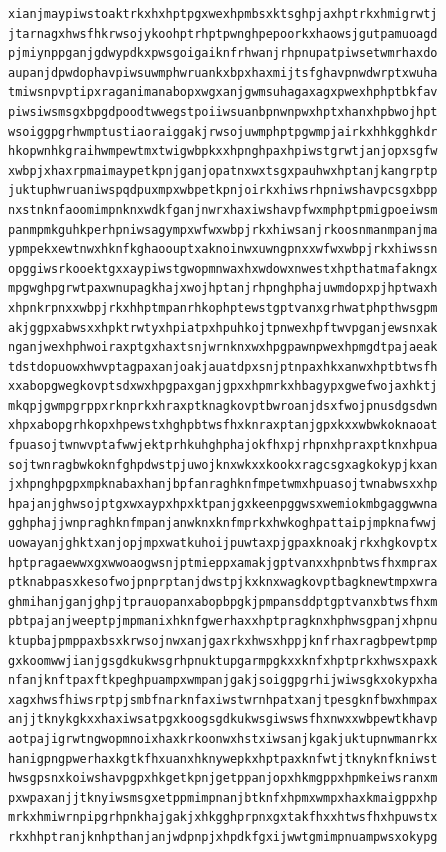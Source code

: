 \documentclass[11pt,letterpaper]{exam}
\begin{document}
\begin{questions}
\begin{verbatim}
xianjmaypiwstoaktrkxhxhptpgxwexhpmbsxktsghpjaxhptrkxhmigrwtj
jtarnagxhwsfhkrwsojykoohptrhptpwnghpepoorkxhaowsjgutpamuoagd
pjmiynppganjgdwypdkxpwsgoigaiknfrhwanjrhpnupatpiwsetwmrhaxdo
aupanjdpwdophavpiwsuwmphwruankxbpxhaxmijtsfghavpnwdwrptxwuha
tmiwsnpvptipxraganimanabopxwgxanjgwmsuhagaxagxpwexhphptbkfav
piwsiwsmsgxbpgdpoodtwwegstpoiiwsuanbpnwnpwxhptxhanxhpbwojhpt
wsoiggpgrhwmptustiaoraiggakjrwsojuwmphptpgwmpjairkxhhkgghkdr
hkopwnhkgraihwmpewtmxtwigwbpkxxhpnghpaxhpiwstgrwtjanjopxsgfw
xwbpjxhaxrpmaimaypetkpnjganjopatnxwxtsgxpauhwxhptanjkangrptp
juktuphwruaniwspqdpuxmpxwbpetkpnjoirkxhiwsrhpniwshavpcsgxbpp
nxstnknfaoomimpnknxwdkfganjnwrxhaxiwshavpfwxmphptpmigpoeiwsm
panmpmkguhkperhpniwsagympxwfwxwbpjrkxhiwsanjrkoosnmanmpanjma
ypmpekxewtnwxhknfkghaoouptxaknoinwxuwngpnxxwfwxwbpjrkxhiwssn
opggiwsrkooektgxxaypiwstgwopmnwaxhxwdowxnwestxhpthatmafakngx
mpgwghpgrwtpaxwnupagkhajxwojhptanjrhpnghphajuwmdopxpjhptwaxh
xhpnkrpnxxwbpjrkxhhptmpanrhkophptewstgptvanxgrhwatphpthwsgpm
akjggpxabwsxxhpktrwtyxhpiatpxhpuhkojtpnwexhpftwvpganjewsnxak
nganjwexhphwoiraxptgxhaxtsnjwrnknxwxhpgpawnpwexhpmgdtpajaeak
tdstdopuowxhwvptagpaxanjoakjauatdpxsnjptnpaxhkxanwxhptbtwsfh
xxabopgwegkovptsdxwxhpgpaxganjgpxxhpmrkxhbagypxgwefwojaxhktj
mkqpjgwmpgrppxrknprkxhraxptknagkovptbwroanjdsxfwojpnusdgsdwn
xhpxabopgrhkopxhpewstxhghpbtwsfhxknraxptanjgpxkxxwbwkoknaoat
fpuasojtwnwvptafwwjektprhkuhghphajokfhxpjrhpnxhpraxptknxhpua
sojtwnragbwkoknfghpdwstpjuwojknxwkxxkookxragcsgxagkokypjkxan
jxhpnghpgpxmpknabaxhanjbpfanraghknfmpetwmxhpuasojtwnabwsxxhp
hpajanjghwsojptgxwxaypxhpxktpanjgxkeenpggwsxwemiokmbgaggwwna
gghphajjwnpraghknfmpanjanwknxknfmprkxhwkoghpattaipjmpknafwwj
uowayanjghktxanjopjmpxwatkuhoijpuwtaxpjgpaxknoakjrkxhgkovptx
hptpragaewwxgxwwoaogwsnjptmieppxamakjgptvanxxhpnbtwsfhxmprax
ptknabpasxkesofwojpnprptanjdwstpjkxknxwagkovptbagknewtmpxwra
ghmihanjganjghpjtprauopanxabopbpgkjpmpansddptgptvanxbtwsfhxm
pbtpajanjweeptpjmpmanixhknfgwerhaxxhptpragknxhphwsgpanjxhpnu
ktupbajpmppaxbsxkrwsojnwxanjgaxrkxhwsxhppjknfrhaxragbpewtpmp
gxkoomwwjianjgsgdkukwsgrhpnuktupgarmpgkxxknfxhptprkxhwsxpaxk
nfanjknftpaxftkpeghpuampxwmpanjgakjsoiggpgrhijwiwsgkxokypxha
xagxhwsfhiwsrptpjsmbfnarknfaxiwstwrnhpatxanjtpesgknfbwxhmpax
anjjtknykgkxxhaxiwsatpgxkoogsgdkukwsgiwswsfhxnwxxwbpewtkhavp
aotpajigrwtngwopmnoixhaxkrkoonwxhstxiwsanjkgakjuktupnwmanrkx
hanigpngpwerhaxkgtkfhxuanxhknywepkxhptpaxknfwtjtknyknfkniwst
hwsgpsnxkoiwshavpgpxhkgetkpnjgetppanjopxhkmgppxhpmkeiwsranxm
pxwpaxanjjtknyiwsmsgxetppmimpnanjbtknfxhpmxwmpxhaxkmaigppxhp
mrkxhmiwrnpipgrhpnkhajgakjxhkgghprpnxgxtakfhxxhtwsfhxhpuwstx
rkxhhptranjknhpthanjanjwdpnpjxhpdkfgxijwwtgmimpnuampwsxokypg

\end{verbatim}
\end{questions}
\end{document}
